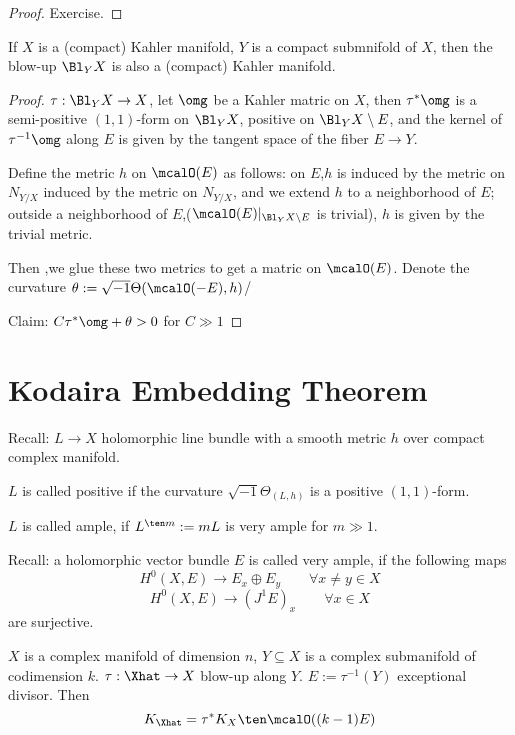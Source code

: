\begin{proof}
  Exercise.
\end{proof}

\begin{cor}
If $X$ is a (compact) Kahler manifold, $Y$ is a compact submnifold
of $X$, then the blow-up $\Bl_YX$ is also a (compact) Kahler manifold.
\end{cor}

\begin{proof}
$\tau:\Bl_YX\to X$, let $\omg$ be a Kahler matric on $X$,
then $\tau^*\omg$ is a semi-positive $(1,1)$-form on $\Bl_YX$,
positive on $\Bl_YX\setminus E$, and the kernel of $\tau^{-1}\omg$
along $E$ is given by the tangent space of the fiber $E\to Y$.

Define the metric $h$ on $\mcalO(E)$ as follows:
on $E$,$h$ is induced by the metric on $N_{Y/X}$ induced by the metric on $N_{Y/X}$,
and we extend $h$ to a neighborhood of $E$;
outside a neighborhood of $E$,($\mcalO(E)|_{\Bl_YX\setminus E}$ is trivial),
$h$ is given by the trivial metric.

Then ,we glue these two metrics to get a matric on $\mcalO(E)$.
Denote the curvature $\theta:=\sqrt{-1}\Theta(\mcalO(-E),h)$/

Claim: $C\tau^*\omg+\theta>0$ for $C\gg 1$
\end{proof}



\section{Kodaira Embedding Theorem}

Recall: $L\to X$ holomorphic line bundle with a smooth metric $h$
over compact complex manifold.

$L$ is called positive if the curvature $\sqrt{-1}\Theta_{(L,h)}$
is a positive $(1,1)$-form.

$L$ is called ample, if $L^{\ten m}:= mL$ is very ample for $m\gg 1$.

Recall: a holomorphic vector bundle $E$ is called very ample,
if the following maps
$$H^0(X,E)\to E_x\oplus E_y\qquad \forall x\neq y\in X$$
$$H^0(X,E)\to (J^1E)_x\qquad \forall x\in X$$
are surjective.

\begin{prop}
$X$ is a complex manifold of dimension $n$, $Y\subseteq X$
is a complex submanifold of codimension $k$. $\tau:\Xhat\to X$
blow-up along $Y$. $E:=\tau^{-1}(Y)$ exceptional divisor. Then
$$K_{\Xhat}=\tau^{*}K_X\ten\mcalO((k-1)E)$$
\end{prop}


